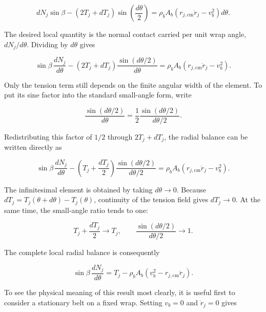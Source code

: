 \documentclass[11pt]{report}
\numberwithin{equation}{section}
\begin{document}
\begin{equation}
    dN_j\sin\beta
    -
    \left(2T_j+dT_j\right)
    \sin\!\left(\frac{d\theta}{2}\right)
    =
    \rho_bA_b
    \left(
        r_{j,\mathrm{cm}}\ddot r_j-v_b^2
    \right)d\theta.
    \label{eq:wrap_radial_balance_expanded}
\end{equation}

The desired local quantity is the normal contact carried per unit wrap angle,
\(dN_j/d\theta\). Dividing
 by \(d\theta\) gives

\[
    \sin\beta\,\frac{dN_j}{d\theta}
    -
    \left(2T_j+dT_j\right)
    \frac{\sin(d\theta/2)}{d\theta}
    =
    \rho_bA_b
    \left(
        r_{j,\mathrm{cm}}\ddot r_j-v_b^2
    \right).
\]

Only the tension term still depends on the finite angular width of the
element. To put its sine factor into the standard small-angle form, write

\[
    \frac{\sin(d\theta/2)}{d\theta}
    =
    \frac{1}{2}
    \frac{\sin(d\theta/2)}{d\theta/2}.
\]

Redistributing this factor of \(1/2\) through \(2T_j+dT_j\), the radial
balance can be written directly as

\[
    \sin\beta\,\frac{dN_j}{d\theta}
    -
    \left(T_j+\frac{dT_j}{2}\right)
    \frac{\sin(d\theta/2)}{d\theta/2}
    =
    \rho_bA_b
    \left(
        r_{j,\mathrm{cm}}\ddot r_j-v_b^2
    \right).
\]

The infinitesimal element is obtained by taking
\(d\theta\rightarrow0\). Because
\(dT_j=T_j(\theta+d\theta)-T_j(\theta)\), continuity of the tension field
gives \(dT_j\rightarrow0\). At the same time, the small-angle ratio tends to
one:

\[
    T_j+\frac{dT_j}{2}
    \longrightarrow
    T_j,
    \qquad
    \frac{\sin(d\theta/2)}{d\theta/2}
    \longrightarrow
    1.
\]

The complete local radial balance is consequently

\begin{equation}
\boxed{
    \sin\beta\,
    \frac{dN_j}{d\theta}
    =
    T_j
    -
    \rho_bA_b
    \left(
        v_b^2-r_{j,\mathrm{cm}}\ddot r_j
    \right).
}
    \label{eq:wrap_radial_balance}
\end{equation}

To see the physical meaning of this result most clearly, it is useful first to
consider a stationary belt on a fixed wrap. Setting \(v_b=0\) and
\(\ddot r_j=0\) gives
\end{document}
